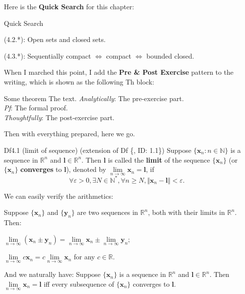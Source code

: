 \documentclass{article}
\begin{document}
Here is the \textbf{Quick Search} for this chapter:
\begin{Th}{Quick Search}
    \begin{compactdesc}
        \item[] (4.2.*): Open sets and closed sets.
        \item[] (4.3.*): Sequentially compact $\Leftrightarrow$ compact $\Leftrightarrow$ bounded closed.
    \end{compactdesc}
\end{Th}

When I marched this point, I add the \textbf{Pre \& Post Exercise} pattern to the writing, which is shown as the following Th block:

\begin{Th}{Some theorem}
    The text.
    \tcblower
    \textcolor{P}{\textit{Analytically}: The pre-exercise part.}\\
    \textit{Pf}: The formal proof.\\
    \textcolor{P}{\textit{Thoughtfully}: The post-exercise part.}
\end{Th}

Then with everything prepared, here we go.

\begin{Df}{Df4.1 (limit of sequence) (extension of Df \{, ID: 1.1\})}
    Suppose $\{\pmb{x}_n: n\in\mathbb{N}\}$ is a sequence in $\mathbb{R}^n$ and $\pmb{l}\in\mathbb{R}^n$. Then $\pmb{l}$ is called the \textbf{limit} of the sequence $\{\pmb{x}_n\}$ (or $\{\pmb{x}_n\}$ \textbf{converges} to $\pmb{l}$), denoted by $\lim\limits_{n\to\infty} \pmb{x}_n = \pmb{l}$, if
    $$\forall \varepsilon > 0, \exists N\in\mathbb{N}^\ast, \forall n\geq N, \Vert \pmb{x}_n - \pmb{l}\Vert < \varepsilon.$$
\end{Df}

\begin{Rmk}{}
    We can easily verify the arithmetics:
    \textcolor{Th}{Suppose $\{\pmb{x}_n\}$ and $\{\pmb{y}_n\}$ are two sequences in $\mathbb{R}^n$, both with their limits in $\mathbb{R}^n$. Then:
    \begin{compactenum}
        \item $\lim\limits_{n\to\infty} (\pmb{x}_n\pm\pmb{y}_n) = \lim\limits_{n\to\infty} \pmb{x}_n \pm \lim\limits_{n\to\infty} \pmb{y}_n$;
        \item $\lim\limits_{n\to\infty} c\pmb{x}_n = c\lim\limits_{n\to\infty} \pmb{x}_n$ for any $c\in\mathbb{R}$.
    \end{compactenum}}
    And we naturally have:
    \textcolor{Th}{Suppose $\{\pmb{x}_n\}$ is a sequence in $\mathbb{R}^n$ and $\pmb{l}\in\mathbb{R}^n$. Then $\lim\limits_{n\to\infty} \pmb{x}_n = \pmb{l}$ iff every subsequence of $\{\pmb{x}_n\}$ converges to $\pmb{l}$.}
\end{Rmk}
\end{document}
